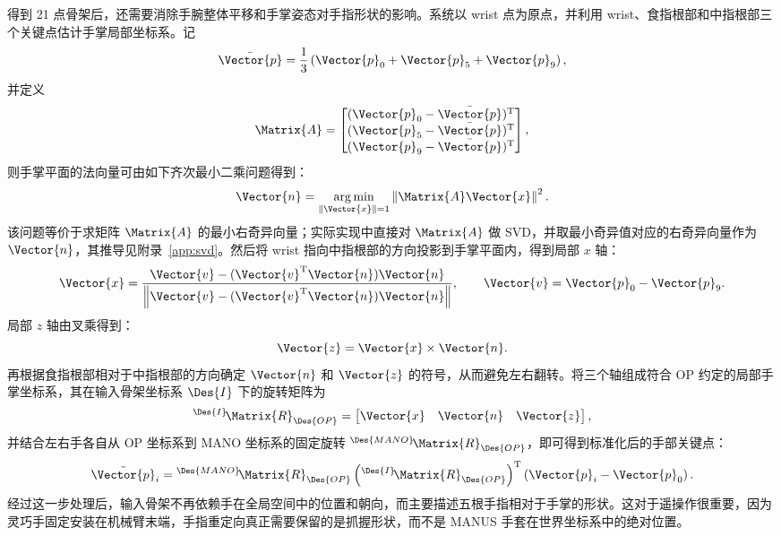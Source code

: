 得到 21 点骨架后，还需要消除手腕整体平移和手掌姿态对手指形状的影响。系统以 wrist 点为原点，并利用 wrist、食指根部和中指根部三个关键点估计手掌局部坐标系。记
\begin{equation}
    \bar{\Vector{p}}=
    \frac{1}{3}\left(\Vector{p}_0+\Vector{p}_5+\Vector{p}_9\right),
\end{equation}
并定义
\begin{equation}
    \Matrix{A}=
    \begin{bmatrix}
        (\Vector{p}_0-\bar{\Vector{p}})^\mathrm{T}\\
        (\Vector{p}_5-\bar{\Vector{p}})^\mathrm{T}\\
        (\Vector{p}_9-\bar{\Vector{p}})^\mathrm{T}
    \end{bmatrix},
\end{equation}
则手掌平面的法向量可由如下齐次最小二乘问题得到：
\begin{equation}
    \Vector{n} =
    \operatorname*{arg\,min}_{\|\Vector{x}\|=1}
    \left\|\Matrix{A}\Vector{x}\right\|^2 .
\end{equation}
该问题等价于求矩阵 $\Matrix{A}$ 的最小右奇异向量；实际实现中直接对 $\Matrix{A}$ 做 SVD，并取最小奇异值对应的右奇异向量作为 $\Vector{n}$，其推导见附录~\ref{app:svd}。然后将 wrist 指向中指根部的方向投影到手掌平面内，得到局部 $x$ 轴：
\begin{equation}
    \Vector{x} =
    \frac{\Vector{v}-(\Vector{v}^{\mathrm{T}}\Vector{n})\Vector{n}}
    {\left\|\Vector{v}-(\Vector{v}^{\mathrm{T}}\Vector{n})\Vector{n}\right\|},
    \qquad
    \Vector{v}=\Vector{p}_0-\Vector{p}_9 .
\end{equation}
局部 $z$ 轴由叉乘得到：
\begin{equation}
    \Vector{z}=\Vector{x}\times\Vector{n}.
\end{equation}
再根据食指根部相对于中指根部的方向确定 $\Vector{n}$ 和 $\Vector{z}$ 的符号，从而避免左右翻转。将三个轴组成符合 OP 约定的局部手掌坐标系，其在输入骨架坐标系 $\Des{I}$ 下的旋转矩阵为
\begin{equation}
    {}^{\Des{I}}\!\Matrix{R}_{\Des{OP}} =
    \begin{bmatrix}
        \Vector{x} & \Vector{n} & \Vector{z}
    \end{bmatrix},
\end{equation}
并结合左右手各自从 OP 坐标系到 MANO 坐标系的固定旋转 ${}^{\Des{MANO}}\!\Matrix{R}_{\Des{OP}}$，即可得到标准化后的手部关键点：
\begin{equation}
    \tilde{\Vector{p}}_i =
    {}^{\Des{MANO}}\!\Matrix{R}_{\Des{OP}}
    \left({}^{\Des{I}}\!\Matrix{R}_{\Des{OP}}\right)^{\mathrm{T}}
    \left(\Vector{p}_i-\Vector{p}_0\right).
\end{equation}
经过这一步处理后，输入骨架不再依赖手在全局空间中的位置和朝向，而主要描述五根手指相对于手掌的形状。这对于遥操作很重要，因为灵巧手固定安装在机械臂末端，手指重定向真正需要保留的是抓握形状，而不是 MANUS 手套在世界坐标系中的绝对位置。

